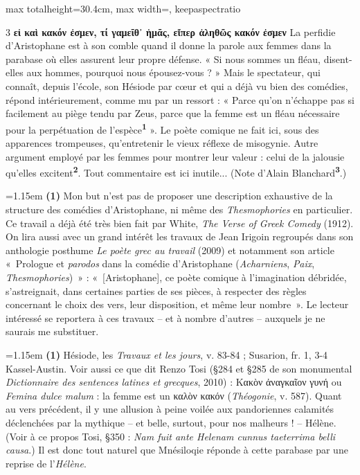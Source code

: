 \documentclass[11pt,twoside]{book}
\newcommand{\italique}[1]{\textit{#1}}
\newcommand{\latin}[1]{\textit{#1}}
\newcommand{\marqueur}[1]{\textsuperscript{\color{rubricRed}\textbf{#1}}}
\begin{document}
\begin{adjustbox}{max totalheight=30.4cm, max width=\textwidth, keepaspectratio}
\begin{minipage}{\textwidth}
{\begin{multicols}{3}
 \textbf{εἰ καὶ κακόν ἐσμεν, τί γαμεῖθ᾽ ἡμᾶς, εἴπερ ἀληθῶς κακόν ἐσμεν} La perfidie d'Aristophane est à son comble quand il donne la parole aux femmes dans la parabase où elles assurent leur propre défense. « Si nous sommes un fléau, disent-elles aux hommes, pourquoi nous épousez-vous ? » Mais le spectateur, qui connaît, depuis l'école, son Hésiode par cœur et qui a déjà vu bien des comédies, répond intérieurement, comme mu par un ressort : « Parce qu'on n'échappe pas si facilement au piège tendu par Zeus, parce que la femme est un fléau nécessaire pour la perpétuation de l'espèce\marqueur{1} ». Le poète comique ne fait ici, sous des apparences trompeuses, qu'entretenir le vieux réflexe de misogynie. Autre argument employé par les femmes pour montrer leur valeur : celui de la jalousie qu'elles excitent\marqueur{2}. Tout commentaire est ici inutile... (Note d'Alain Blanchard\marqueur{3}.)
\par\vspace{1.5pt}
\par\vspace{1.2pt}\par\nopagebreak\vspace{1pt}\noindent\hangindent=1.15em {\color{sepiaNote}\textbf{(1)}} Mon but n'est pas de proposer une description exhaustive de la structure des comédies d'Aristophane, ni même des \italique{Thesmophories} en particulier. Ce travail a déjà été très bien fait par White, \italique{The Verse of Greek Comedy} (1912). On lira aussi avec un grand intérêt les travaux de Jean Irigoin regroupés dans son anthologie posthume \italique{Le poète grec au travail} (2009) et notamment son article «~Prologue et \italique{parodos} dans la comédie d'Aristophane (\italique{Acharniens}, \italique{Paix}, \italique{Thesmophories})~» :  «~[Aristophane], ce poète comique à l'imagination débridée, s'astreignait, dans certaines parties de ses pièces, à respecter des règles concernant le choix des vers, leur disposition, et même leur nombre~». Le lecteur intéressé se reportera à ces travaux -- et à nombre d'autres -- auxquels je ne saurais me substituer.
\par\vspace{1.5pt}
\noindent\hangindent=1.15em {\color{sepiaNote}\textbf{(1)}} Hésiode, les \italique{Travaux et les jours}, v. 83-84 ; Susarion, fr. 1, 3-4 Kassel-Austin. Voir aussi ce que dit Renzo Tosi (§284 et §285 de son monumental \italique{Dictionnaire des sentences latines et grecques}, 2010) : Κακὸν ἀναγκαῖον γυνή ou \latin{Femina dulce malum} : la femme est un καλὸν κακόν (\italique{Théogonie}, v. 587). Quant au vers précédent, il y une allusion à peine voilée aux pandoriennes calamités déclenchées par la mythique -- et belle, surtout, pour nos malheurs ! -- Hélène. (Voir à ce propos Tosi, §350 : \latin{Nam fuit ante Helenam cunnus taeterrima belli causa}.) Il est donc tout naturel que Mnésiloqie réponde à cette parabase par une reprise de l'\italique{Hélène}.

\end{multicols}}
\end{minipage}
\end{adjustbox}
\end{document}
